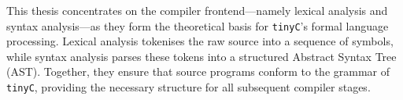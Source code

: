 This thesis concentrates on the compiler frontend—namely lexical analysis and syntax analysis—as they form the theoretical basis for \texttt{tinyC}’s formal language processing. Lexical analysis tokenises the raw source into a sequence of symbols, while syntax analysis parses these tokens into a structured Abstract Syntax Tree (AST). Together, they ensure that source programs conform to the grammar of \texttt{tinyC}, providing the necessary structure for all subsequent compiler stages.


